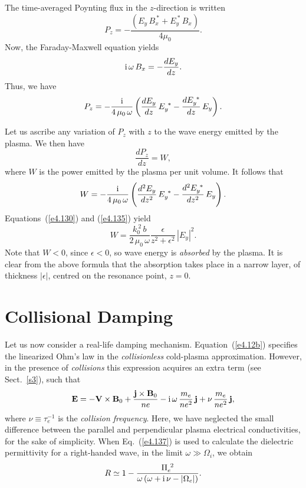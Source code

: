 The time-averaged Poynting flux in the $z$-direction is written
\begin{equation}
P_z = - \frac{(E_y\,B_x^{~\ast} + E_y^{~\ast}\,B_x)}{4 \mu_0}.
\end{equation}
Now, the Faraday-Maxwell equation yields
\begin{equation}
{\rm i}\,\omega\,B_x = -\frac{d E_y}{dz}.
\end{equation}
Thus, we have
\begin{equation}
P_z = -\frac{{\rm i}}{4\,\mu_0\,\omega} \left(\frac{d E_y}{dz}\, E_y^{~\ast}
- \frac{d E_y^{~\ast}}{dz} \,E_y\right).
\end{equation}

Let us ascribe any variation of $P_z$ with $z$ to the wave energy emitted by the
plasma.  We then have
\begin{equation}
\frac{d P_z}{dz} = W,
\end{equation}
where $W$ is the power emitted by the plasma per unit volume.
It follows that
\begin{equation}\label{e4.135}
W = -\frac{{\rm i}}{4\,\mu_0\,\omega}\left(\frac{d^2 E_y}{dz^2}\,E_y^{~\ast}
- \frac{d^2 E_y^{~\ast}}{dz^2}\,E_y\right).
\end{equation}
Equations~(\ref{e4.130}) and (\ref{e4.135}) yield
\begin{equation}
W = \frac{k_0^{~2}\,b}{2\,\mu_0\,\omega} \frac{\epsilon}{z^2 + \epsilon^2}\, |E_y|^2.
\end{equation}
Note that $W<0$, since $\epsilon<0$, so wave energy is {\em absorbed}\/ by the
plasma. It is clear from the above formula that the absorption takes
place in a narrow layer, of thickness $|\epsilon|$, centred on the
resonance point, $z=0$.

\section{Collisional Damping}
Let us now consider a real-life damping mechanism. Equation~(\ref{e4.12b})
specifies the linearized Ohm's law in the {\em collisionless}\/ 
cold-plasma approximation.
However, in the presence of {\em collisions}\/ this expression acquires
an extra term (see Sect.~\ref{s3}), such  that
\begin{equation}\label{e4.137}
{\bf E} = - {\bf V}\times{\bf B}_0 + \frac{{\bf j}\times{\bf B}_0}{ne}
-{\rm i}\,\omega\,\frac{m_e}{ne^2}\,{\bf j} + \nu\,\frac{m_e}{n e^2}\,{\bf j},
\end{equation}
where $\nu \equiv\tau_e^{-1}$ is the {\em collision frequency}. Here,
we have neglected the small difference between the parallel and perpendicular
plasma electrical conductivities, for the sake of simplicity. When
Eq.~(\ref{e4.137}) is used to calculate the dielectric permittivity for a
right-handed wave, in the limit $\omega\gg {\Omega}_i$, we obtain
\begin{equation}
R \simeq 1- \frac{{\Pi}_e^{~2}}{\omega\,(\omega+{\rm i}\,\nu
-|{\Omega}_e|)}.
\end{equation}

